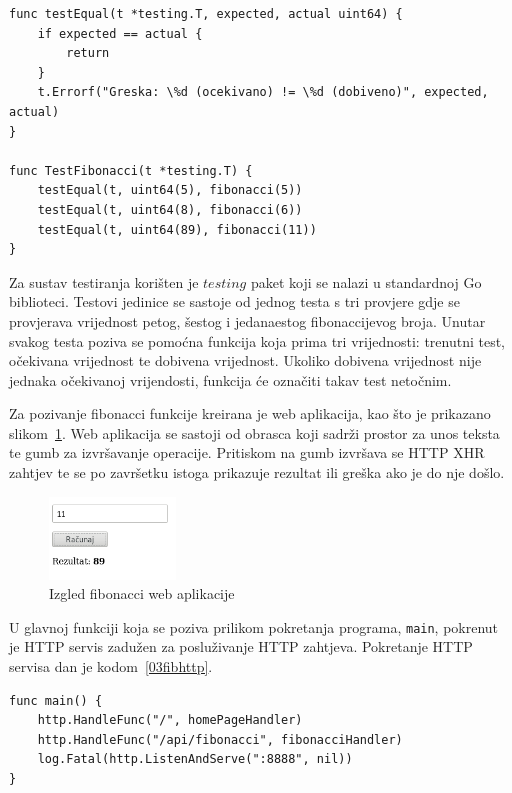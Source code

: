 \begin{lstlisting}[float=h]
func testEqual(t *testing.T, expected, actual uint64) {
	if expected == actual {
		return
	}
	t.Errorf("Greska: \%d (ocekivano) != \%d (dobiveno)", expected, actual)
}

func TestFibonacci(t *testing.T) {
	testEqual(t, uint64(5), fibonacci(5))
	testEqual(t, uint64(8), fibonacci(6))
	testEqual(t, uint64(89), fibonacci(11))
}

\end{lstlisting}

Za sustav testiranja korišten je $testing$ paket koji se nalazi u standardnoj Go biblioteci. Testovi
jedinice se sastoje od jednog testa s tri provjere gdje se provjerava vrijednost petog, šestog i
jedanaestog fibonaccijevog broja.  Unutar svakog testa poziva se pomoćna funkcija koja prima tri
vrijednosti: trenutni test, očekivana vrijednost te dobivena vrijednost. Ukoliko dobivena vrijednost
nije jednaka očekivanoj vrijendosti, funkcija će označiti takav test netočnim.

Za pozivanje fibonacci funkcije kreirana je web aplikacija, kao što je prikazano
slikom~\ref{fig:03fibv1png}. Web aplikacija se sastoji od obrasca koji sadrži prostor za unos teksta
te gumb za izvršavanje operacije. Pritiskom na gumb izvršava se HTTP XHR zahtjev te se po završetku
istoga prikazuje rezultat ili greška ako je do nje došlo.

\begin{figure}[h]
    \centering
    \includegraphics[width=0.3\textwidth]{img/03/fibonacci_html.png}
    \caption{Izgled fibonacci web aplikacije}%
    \label{fig:03fibv1png}
\end{figure}

U glavnoj funkciji koja se poziva prilikom pokretanja programa, \texttt{main}, pokrenut je HTTP
servis zadužen za posluživanje HTTP zahtjeva. Pokretanje HTTP servisa dan je kodom~\ref{03fibhttp}.

\begin{lstlisting}[float=h]
func main() {
	http.HandleFunc("/", homePageHandler)
	http.HandleFunc("/api/fibonacci", fibonacciHandler)
	log.Fatal(http.ListenAndServe(":8888", nil))
}
\end{lstlisting}

